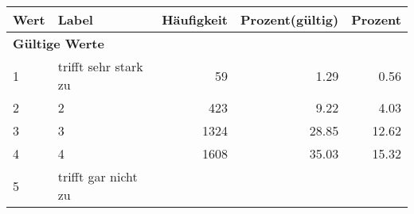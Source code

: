      \begin{longtable}{lXrrr}
     \toprule
     \textbf{Wert} & \textbf{Label} & \textbf{Häufigkeit} & \textbf{Prozent(gültig)} & \textbf{Prozent} \\
     \endhead
     \midrule
     \multicolumn{5}{l}{\textbf{Gültige Werte}}\\

     1 &
     \multicolumn{1}{X}{ trifft sehr stark zu   } &


       \num{59} &
       \num[round-mode=places,round-precision=2]{1,29} &
         \num[round-mode=places,round-precision=2]{0,56} \\

     2 &
     \multicolumn{1}{X}{ 2   } &


       \num{423} &
       \num[round-mode=places,round-precision=2]{9,22} &
         \num[round-mode=places,round-precision=2]{4,03} \\

     3 &
     \multicolumn{1}{X}{ 3   } &


       \num{1324} &
       \num[round-mode=places,round-precision=2]{28,85} &
         \num[round-mode=places,round-precision=2]{12,62} \\

     4 &
     \multicolumn{1}{X}{ 4   } &


       \num{1608} &
       \num[round-mode=places,round-precision=2]{35,03} &
         \num[round-mode=places,round-precision=2]{15,32} \\

     5 &
     \multicolumn{1}{X}{ trifft gar nicht zu   } &



\end{longtable}
